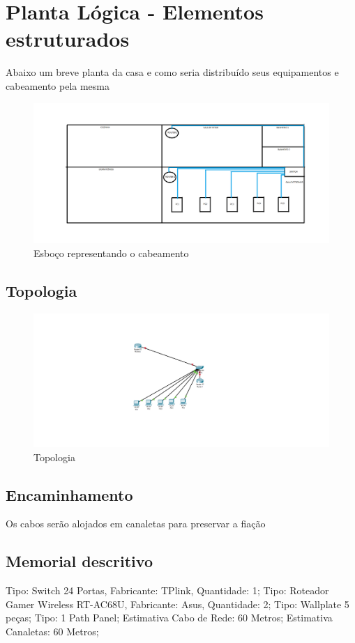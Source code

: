 \documentclass[	DIV=calc,%
							paper=a4,%
							fontsize=12pt,%
							onecolumn]{scrartcl}	 					%
\begin{document}
\section{Planta Lógica - Elementos estruturados}
	Abaixo um breve planta da casa e como seria distribuído seus equipamentos e cabeamento pela mesma 

\begin{figure}
	\centering
	\includegraphics[width=\textwidth]{Planta1}
	\caption{Esboço representando o cabeamento}
	\label{Planta1}
\end{figure}

\subsection{Topologia}

\begin{figure}
	\centering
	\includegraphics[width=\textwidth]{top2}
	\caption{Topologia}
	\label{top2}
\end{figure}

\subsection{Encaminhamento}
	Os cabos serão alojados em canaletas para preservar a fiação

\subsection{Memorial descritivo}
	Tipo: Switch 24 Portas, Fabricante: TPlink, Quantidade: 1;
	Tipo: Roteador Gamer Wireless RT-AC68U, Fabricante: Asus, Quantidade: 2;
	Tipo: Wallplate 5 peças;
	Tipo: 1 Path Panel;
	Estimativa Cabo de Rede: 60 Metros;
	Estimativa Canaletas: 60 Metros;
	
\end{document}

